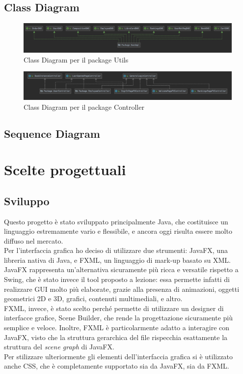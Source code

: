 \documentclass[12pt,a4paper]{article}
\begin{document}
	\subsection{Class Diagram}
	\begin{figure}[h!]
		\centering
		\includegraphics[scale=0.43]{images/Utils.png}
		\caption{Class Diagram per il package Utils}
	\end{figure}
	\begin{figure}[h!]
		\centering
		\includegraphics[scale=0.4]{images/Controller.png}
		\caption{Class Diagram per il package Controller}
	\end{figure}
	\subsection{Sequence Diagram}
	\section{Scelte progettuali}
	\subsection{Sviluppo} 
	Questo progetto è stato sviluppato principalmente Java, che costituisce un linguaggio estremamente vario e flessibile, e ancora oggi risulta essere molto diffuso nel mercato.\\Per l'interfaccia grafica ho deciso di utilizzare due strumenti: JavaFX, una libreria nativa di Java, e FXML, un linguaggio di mark-up basato su XML. \\JavaFX rappresenta un'alternativa sicuramente più ricca e versatile rispetto a Swing, che è stato invece il tool proposto a lezione: essa permette infatti di realizzare GUI molto più elaborate, grazie alla presenza di animazioni, oggetti geometrici 2D e 3D, grafici, contenuti multimediali, e altro.\\FXML, invece, è stato scelto perché permette di utilizzare un designer di interfacce grafice, Scene Builder, che rende la progettazione sicuramente più semplice e veloce. Inoltre, FXML è particolarmente adatto a interagire con JavaFX, visto che la struttura gerarchica del file rispecchia esattamente la struttura del \textit{scene graph} di JavaFX.\\
	Per stilizzare ulteriormente gli elementi dell'interfaccia grafica si è utilizzato anche CSS, che è completamente supportato sia da JavaFX, sia da FXML.
\end{document}
